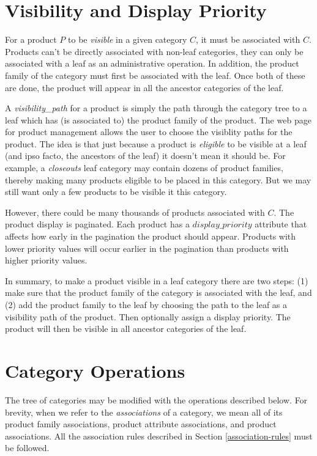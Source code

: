 \documentclass[letterpaper, 12pt]{article}
\begin{document}
\section{Visibility and Display Priority}
For a product $P$ to be {\em visible} in a given category $C$, it must be associated with $C$.  Products can't be directly associated with non-leaf categories, they can only be associated with a leaf as an administrative operation.  In addition, the product family of the category must first be associated with the leaf.  Once both of these are done, the product will appear in all the ancestor categories of the leaf.
\par
A {\em visibility\_path} for a product is simply the path through the category tree to a leaf which has (is associated to) the product family of the product.  The web page for product management allows the user to choose the visiblity paths for the product.  The idea is that just because a product is {\em eligible} to be visible at a leaf (and ipso facto, the ancestors of the leaf) it doesn't mean it should be.  For example, a {\em closeouts} leaf category may contain dozens of product families, thereby making many products eligible to be placed in this category.  But we may still want only a few products to be visible it this category.  
\par
However, there could be many thousands of products associated with $C$.  The product display is paginated. Each product has a $display\_priority$ attribute that affects how early in the pagination the product should appear.  Products with lower priority values will occur earlier in the pagination than products with higher priority values.
\par
In summary, to make a product visible in a leaf category there are two steps: (1) make sure that the product family of the category is associated with the leaf, and (2) add the product family to the leaf by choosing the path to the leaf as a visibility path of the product.  Then optionally assign a display priority.  The product will then be visible in all ancestor categories of the leaf. 

\section{Category Operations}
The tree of categories may be modified with the operations described below.  For brevity, when we refer to the {\em associations} of a category, we mean all of its product family associations, product attribute associations, and product associations.  All the association rules described in Section \ref{association-rules} must be followed.
\end{document}
